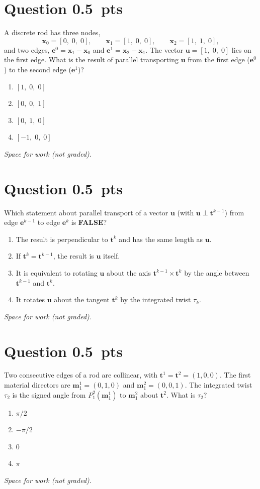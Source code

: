 \documentclass[letterpaper,11pt]{article}
\newcounter{qnum}
\newcommand{\qpts}{0.5}
\newcommand{\mcq}[5]{%
  \clearpage
  \stepcounter{qnum}%
  \section*{Question \theqnum \hfill \normalsize \qpts~pts}
  #1
  \begin{enumerate}[label=(\alph*)]
    \item #2
    \item #3
    \item #4
    \item #5
  \end{enumerate}
  \vspace{3mm}

  \textit{Space for work (not graded).}
}
\begin{document}
%
%
\mcq{A discrete rod has three nodes,
\[
\mathbf{x}_0 = [0, \; 0, \; 0], \qquad \mathbf{x}_1 = [1, \; 0, \; 0], \qquad \mathbf{x}_2 = [1, \; 1, \; 0],
\]
and two edges, $\mathbf{e}^0 = \mathbf{x}_1 - \mathbf{x}_0$ and $\mathbf{e}^1 = \mathbf{x}_2 - \mathbf{x}_1$. The vector $\mathbf{u} = [1, \; 0, \; 0]$ lies on the first edge. What is the result of parallel transporting $\mathbf{u}$ from the first edge ($\mathbf{e}^0$) to the second edge ($\mathbf{e}^1$)?}
  {$[1, \; 0, \; 0]$}
  {$[0, \; 0, \; 1]$}
  {$[0, \; 1, \; 0]$}
  {$[-1, \; 0, \; 0]$}

%
%
\mcq{Which statement about parallel transport of a vector $\mathbf{u}$ (with $\mathbf{u} \perp \mathbf{t}^{k-1}$) from edge $\mathbf{e}^{k-1}$ to edge $\mathbf{e}^{k}$ is \textbf{FALSE}?}
  {The result is perpendicular to $\mathbf{t}^{k}$ and has the same length as $\mathbf{u}$.}
  {If $\mathbf{t}^{k} = \mathbf{t}^{k-1}$, the result is $\mathbf{u}$ itself.}
  {It is equivalent to rotating $\mathbf{u}$ about the axis $\mathbf{t}^{k-1} \times \mathbf{t}^{k}$ by the angle between $\mathbf{t}^{k-1}$ and $\mathbf{t}^{k}$.}
  {It rotates $\mathbf{u}$ about the tangent $\mathbf{t}^{k}$ by the integrated twist $\tau_k$.}

%
%
\mcq{Two consecutive edges of a rod are collinear, with $\mathbf{t}^1 = \mathbf{t}^2 = (1, 0, 0)$. The first material directors are $\mathbf{m}^1_1 = (0, 1, 0)$ and $\mathbf{m}^2_1 = (0, 0, 1)$. The integrated twist $\tau_2$ is the signed angle from $P^2_1(\mathbf{m}^1_1)$ to $\mathbf{m}^2_1$ about $\mathbf{t}^2$. What is $\tau_2$?}
  {$\pi/2$}
  {$-\pi/2$}
  {$0$}
  {$\pi$}
\end{document}
